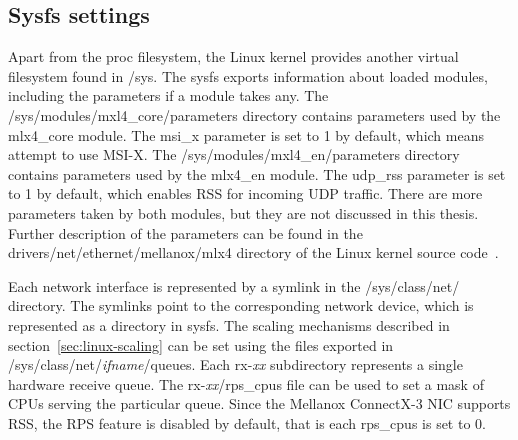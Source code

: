 
\subsection{Sysfs settings}\label{subsec:analysis-settings-sysfs}
Apart from the proc filesystem, the Linux kernel provides another virtual filesystem found in /sys.
The sysfs exports information about loaded modules, including the parameters if a module takes any.
The /sys/modules/mxl4\_core/parameters directory contains parameters used by the mlx4\_core module.
The msi\_x parameter is set to 1 by default, which means attempt to use MSI-X.
The /sys/modules/mxl4\_en/parameters directory contains parameters used by the mlx4\_en module.
The udp\_rss parameter is set to 1 by default, which enables RSS for incoming UDP traffic.
There are more parameters taken by both modules, but they are not discussed in this thesis.
Further description of the parameters can be found
in the drivers/net/ethernet/mellanox/mlx4 directory of the Linux kernel source code~\cite{kernel-source}.

Each network interface is represented by a symlink in the /sys/class/net/ directory.
The symlinks point to the corresponding network device, which is represented as a directory in sysfs.
The scaling mechanisms described in section~\ref{sec:linux-scaling} can be set
using the files exported in /sys/class/net/{\it{ifname}}/queues.
Each rx-{\it{xx}} subdirectory represents a single hardware receive queue.
The rx-{\it{xx}}/rps\_cpus file can be used to set a mask of CPUs serving the particular queue.
Since the Mellanox ConnectX-3 NIC supports RSS, the RPS feature is disabled by default, that is each rps\_cpus is set to 0.

